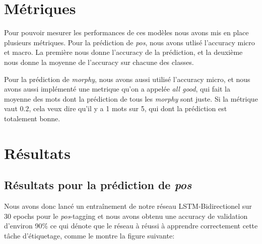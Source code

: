 \documentclass[a4paper]{article}
\begin{document}
\section{Métriques}

Pour pouvoir mesurer les performances de ces modèles nous avons mis en place plusieurs métriques. Pour la prédiction de 
\textit{pos}, nous avons utlisé l'accuracy micro et macro. La première nous donne l'accuracy de la prédiction, et la deuxième
nous donne la moyenne de l'accuracy sur chacune des classes. 

Pour la prédiction de \textit{morphy}, nous avons aussi utilisé l'accuracy micro, et nous avons aussi implémenté une 
metrique qu'on a appelée \textit{all good}, qui fait la moyenne des mots dont la prédiction de tous les \textit{morphy}
sont juste. Si la métrique vaut $0.2$, cela veux dire qu'il y a 1 mots sur 5, qui dont la prédiction est totalement bonne.


\section{Résultats}

\subsection{Résultats pour la prédiction de \textit{pos}}
Nous avons donc lancé un entraînement de notre réseau LSTM-Bidirectionel sur 30 epochs pour le \textit{pos}-tagging et 
nous avons obtenu une accuracy de validation d'environ 90\% ce qui dénote que le réseau à réussi à apprendre 
correctement cette tâche d'étiquetage, comme le montre la figure suivante:
\end{document}
